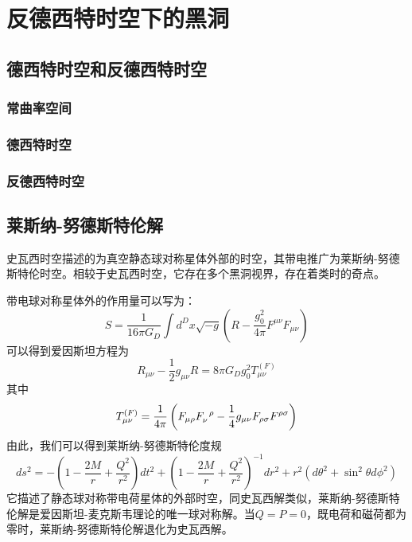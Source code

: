 \chapter{反德西特时空下的黑洞}
\section{德西特时空和反德西特时空}
\subsection{常曲率空间}
\subsection{德西特时空}
\subsection{反德西特时空}
\section{莱斯纳-努德斯特伦解}
史瓦西时空描述的为真空静态球对称星体外部的时空，其带电推广为莱斯纳-努德斯特伦时空。相较于史瓦西时空，它存在多个黑洞视界，存在着类时的奇点。

带电球对称星体外的作用量可以写为：
\begin{equation}
    S=\frac{1}{16 \pi G_D}\int d^D x \sqrt{-g}\left(R-\frac{g_{0}^2}{4 \pi}F^{\mu \nu}F_{\mu \nu}\right)
\end{equation}
可以得到爱因斯坦方程为
\begin{equation}
    R_{\mu \nu}-\frac{1}{2}g_{\mu \nu}R=8\pi G_D g_0^2 T^{\left(F\right)}_{\mu \nu}
\end{equation}
其中
\begin{equation}
    T^{\left(F\right)}_{\mu \nu}=\frac{1}{4\pi}\left(F_{\mu \rho }F\indices{_{\nu}^{\rho}}-\frac{1}{4}g_{\mu \nu}F_{\rho \sigma}F^{\rho \sigma} \right)
\end{equation}
由此，我们可以得到莱斯纳-努德斯特伦度规\citep{陈斌2018广义相对论}
\begin{equation}\label{eq: RNmetric}
     ds^2=-\left(1-\frac{2M}{r}+\frac{Q^2}{r^2}\right)dt^2+\left(1-\frac{2M}{r}+\frac{Q^2}{r^2}\right)^{-1}dr^2+r^2\left(d\theta^2+\sin ^2 \theta d\phi^2\right)
\end{equation}
它描述了静态球对称带电荷星体的外部时空，同史瓦西解类似，莱斯纳-努德斯特伦解是爱因斯坦-麦克斯韦理论的唯一球对称解。当$Q=P=0$，既电荷和磁荷都为零时，莱斯纳-努德斯特伦解退化为史瓦西解。

